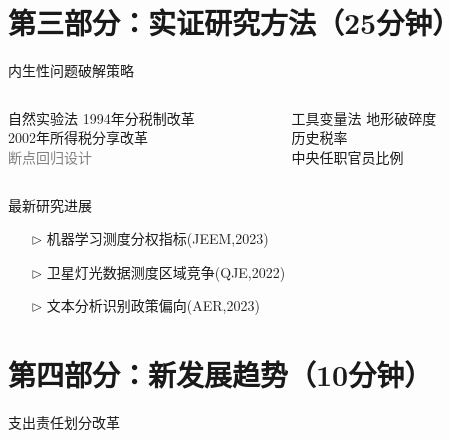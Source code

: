 \documentclass{beamer}
\begin{document}
\section{第三部分：实证研究方法（25分钟）}\label{ux7b2cux4e09ux90e8ux5206ux5b9eux8bc1ux7814ux7a76ux65b9ux6cd525ux5206ux949f}

\begin{frame}{内生性问题破解策略}
\label{ux5185ux751fux6027ux95eeux9898ux7834ux89e3ux7b56ux7565}
\footnotesize

\begin{columns}[T]
\begin{column}{0.45\textwidth}
  \begin{exampleblock}{自然实验法}
    1994年分税制改革\\
    2002年所得税分享改革\\
    \textcolor{gray}{断点回归设计}
  \end{exampleblock}
\end{column}
\begin{column}{0.45\textwidth}
  \begin{alertblock}{工具变量法}
    地形破碎度\\
    历史税率\\
    中央任职官员比例
  \end{alertblock}
\end{column}
\end{columns}
\end{frame}

\begin{frame}{最新研究进展}
\label{ux6700ux65b0ux7814ux7a76ux8fdbux5c55}
\footnotesize

\begin{itemize}
\item[$\triangleright$] 机器学习测度分权指标(JEEM,2023)
\item[$\triangleright$] 卫星灯光数据测度区域竞争(QJE,2022)
\item[$\triangleright$] 文本分析识别政策偏向(AER,2023)
\end{itemize}
\end{frame}

\section{第四部分：新发展趋势（10分钟）}\label{ux7b2cux56dbux90e8ux5206ux65b0ux53d1ux5c55ux8d8bux52bf10ux5206ux949f}

\begin{frame}{支出责任划分改革}
\label{ux652fux51faux8d23ux4efbux5212ux5206ux6539ux9769}
\end{frame}
\end{document}
